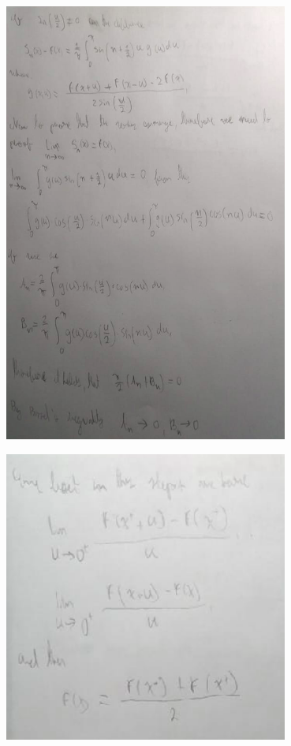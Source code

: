 \documentclass{article}
\begin{document}
\begin{center}
	\includegraphics[width=0.7\textwidth]{img/2-1-5.png}
\end{center}
\begin{center}
	\includegraphics[width=0.7\textwidth]{img/2-1-6.png}
\end{center}
\newpage
\end{document}
